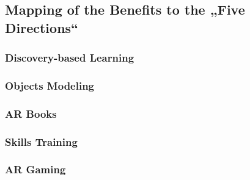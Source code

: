 \subsection{Mapping of the Benefits to the „Five Directions“}
\subsubsection{Discovery-based Learning}
\subsubsection{Objects Modeling}
\subsubsection{AR Books}
\subsubsection{Skills Training}
\subsubsection{AR Gaming}
